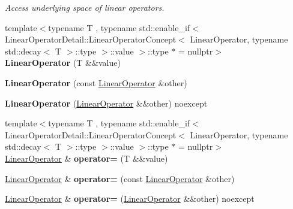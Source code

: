 \begin{DoxyCompactItemize}
\begin{DoxyCompactList}\small\item\em Access underlying space of linear operators. \end{DoxyCompactList}\item 
{\footnotesize template$<$typename T , typename std\+::enable\+\_\+if$<$ Linear\+Operator\+Detail\+::\+Linear\+Operator\+Concept$<$ Linear\+Operator, typename std\+::decay$<$ T $>$\+::type $>$\+::value $>$\+::type $\ast$  = nullptr$>$ }\\{\bfseries Linear\+Operator} (T \&\&value)\hypertarget{classSpacy_1_1LinearOperator_ac8c1647e64c14ce857def39e0148baed}{}\label{classSpacy_1_1LinearOperator_ac8c1647e64c14ce857def39e0148baed}

\item 
{\bfseries Linear\+Operator} (const \hyperlink{classSpacy_1_1LinearOperator}{Linear\+Operator} \&other)\hypertarget{classSpacy_1_1LinearOperator_a23c71e4f80fc5ccb45e8de979cbfe45d}{}\label{classSpacy_1_1LinearOperator_a23c71e4f80fc5ccb45e8de979cbfe45d}

\item 
{\bfseries Linear\+Operator} (\hyperlink{classSpacy_1_1LinearOperator}{Linear\+Operator} \&\&other) noexcept\hypertarget{classSpacy_1_1LinearOperator_a54775f0b362198be4b92e13a688bb3b6}{}\label{classSpacy_1_1LinearOperator_a54775f0b362198be4b92e13a688bb3b6}

\item 
{\footnotesize template$<$typename T , typename std\+::enable\+\_\+if$<$ Linear\+Operator\+Detail\+::\+Linear\+Operator\+Concept$<$ Linear\+Operator, typename std\+::decay$<$ T $>$\+::type $>$\+::value $>$\+::type $\ast$  = nullptr$>$ }\\\hyperlink{classSpacy_1_1LinearOperator}{Linear\+Operator} \& {\bfseries operator=} (T \&\&value)\hypertarget{classSpacy_1_1LinearOperator_a5028289a4b4b38067800ce0514ae34fc}{}\label{classSpacy_1_1LinearOperator_a5028289a4b4b38067800ce0514ae34fc}

\item 
\hyperlink{classSpacy_1_1LinearOperator}{Linear\+Operator} \& {\bfseries operator=} (const \hyperlink{classSpacy_1_1LinearOperator}{Linear\+Operator} \&other)\hypertarget{classSpacy_1_1LinearOperator_a3e1ae48eb708b6130ded1aeccc7711aa}{}\label{classSpacy_1_1LinearOperator_a3e1ae48eb708b6130ded1aeccc7711aa}

\item 
\hyperlink{classSpacy_1_1LinearOperator}{Linear\+Operator} \& {\bfseries operator=} (\hyperlink{classSpacy_1_1LinearOperator}{Linear\+Operator} \&\&other) noexcept\hypertarget{classSpacy_1_1LinearOperator_a370ddb98c4e73cab75e648bb02edb97c}{}\label{classSpacy_1_1LinearOperator_a370ddb98c4e73cab75e648bb02edb97c}


\end{DoxyCompactItemize}

